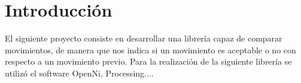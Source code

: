 \section{Introducción}\label{index_intro_sec}
El siguiente proyecto consiste en desarrollar una librería capaz de comparar movimientos, de manera que nos indica si un movimiento es aceptable o no con respecto a un movimiento previo. Para la realización de la siguiente librería se utilizó el software Open\-Ni, Processing....